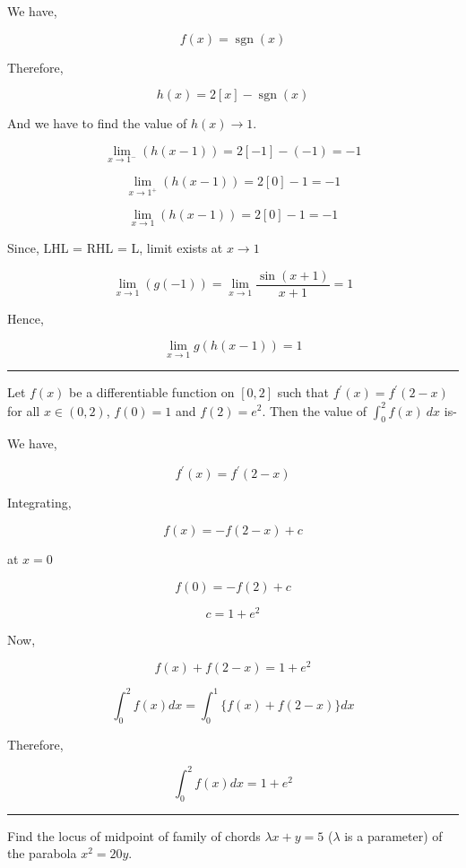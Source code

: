 \documentclass[twocolumn]{article}
\DeclareMathOperator{\sgn}{sgn}
\begin{document}
\begin{CJK*}{UTF8}{gbsn}
We have, 

\[
    f(x) = \sgn (x)
\]

Therefore, 

\[
    h(x) = 2[x] - \sgn (x)
\]

And we have to find the value of \(h(x) \to 1\). 

\[
    \lim_{x \to 1^-}(h(x - 1)) = 2[-1] - (- 1) = -1
\]

\[
    \lim_{x \to 1^{+}} (h(x - 1)) = 2[0] - 1 = -1
\]

\[
    \lim_{x \to 1} (h(x-1)) = 2[0] - 1 = -1
\]

Since, LHL = RHL = L, limit exists at \(x \to 1\)

\[
    \lim_{x \to 1} (g(-1)) = \lim_{x \to 1} \frac{\sin (x +1)}{x+ 1} = 1 \tag{\(\because x+1 \to 0\) when \(x\to-1\)  }
\]

Hence, 

\[
    \boxed{\lim_{x \to 1} g(h(x-1)) = 1} 
\]

\hrule

\begin{question}
    Let \(f(x)\) be a differentiable function on \([0,2]\) such that \(f^{\prime} (x) = f^{\prime} (2- x)\) for all \(x \in (0, 2)\), \(f(0) = 1\) and \(f(2)  = e^{2}\). Then the value of \(\displaystyle \int_{0}^2 f(x)\ dx\) is-   
\end{question}

We have, 

\[
    f^{\prime} (x)  = f^{\prime} (2 -x)
\]

Integrating,

\[
    f(x) = - f(2 - x) + c
\]

at \(x = 0\) 

\[
    f(0) = -f(2) + c
\]

\[
    c = 1 + e^{2} 
\]

Now, 

\[
    f(x) + f(2 - x) = 1 + e^{2} 
\]

\[
    \int_0 ^2 f(x) dx = \int_0 ^1 \{f(x) + f(2-x)\} dx
\]

Therefore, 

\[
    \boxed{\int_{0} ^2 f(x)dx = 1 + e^{2} }
\]

\hrule 

\begin{question}
    Find the locus of midpoint of family of chords \(\lambda x + y = 5\) (\(\lambda\) is a parameter) of the parabola \(x^{2} = 20y\).   
\end{question}


\end{CJK*}
\end{document}
